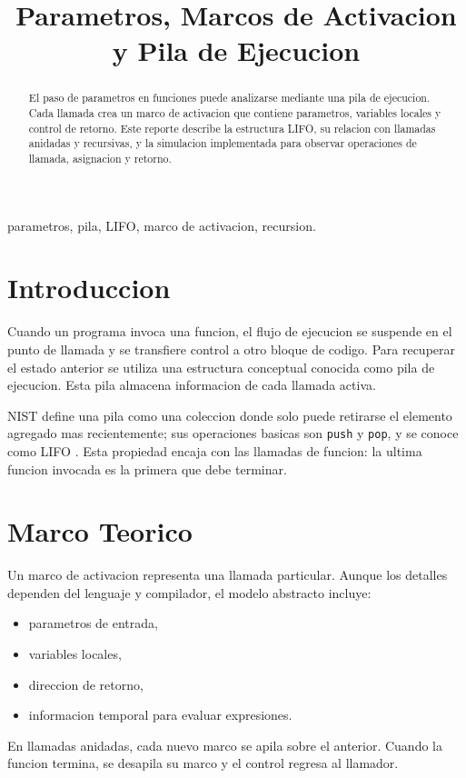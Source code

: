 \documentclass[conference]{IEEEtran}
\title{Parametros, Marcos de Activacion y Pila de Ejecucion}
\author{\IEEEauthorblockN{Ronquillo Nunez Braulio}
\IEEEauthorblockA{Analisis y Diseno de Algoritmos}}
\begin{document}
\maketitle

\begin{abstract}
El paso de parametros en funciones puede analizarse mediante una pila de
ejecucion. Cada llamada crea un marco de activacion que contiene parametros,
variables locales y control de retorno. Este reporte describe la estructura
LIFO, su relacion con llamadas anidadas y recursivas, y la simulacion
implementada para observar operaciones de llamada, asignacion y retorno.
\end{abstract}

\begin{IEEEkeywords}
parametros, pila, LIFO, marco de activacion, recursion.
\end{IEEEkeywords}

\section{Introduccion}
Cuando un programa invoca una funcion, el flujo de ejecucion se suspende en
el punto de llamada y se transfiere control a otro bloque de codigo. Para
recuperar el estado anterior se utiliza una estructura conceptual conocida
como pila de ejecucion. Esta pila almacena informacion de cada llamada activa.

NIST define una pila como una coleccion donde solo puede retirarse el elemento
agregado mas recientemente; sus operaciones basicas son \texttt{push} y
\texttt{pop}, y se conoce como LIFO \cite{nist_stack}. Esta propiedad encaja
con las llamadas de funcion: la ultima funcion invocada es la primera que debe
terminar.

\section{Marco Teorico}
Un marco de activacion representa una llamada particular. Aunque los detalles
dependen del lenguaje y compilador, el modelo abstracto incluye:
\begin{itemize}
\item parametros de entrada,
\item variables locales,
\item direccion de retorno,
\item informacion temporal para evaluar expresiones.
\end{itemize}
En llamadas anidadas, cada nuevo marco se apila sobre el anterior. Cuando la
funcion termina, se desapila su marco y el control regresa al llamador.
\end{document}
